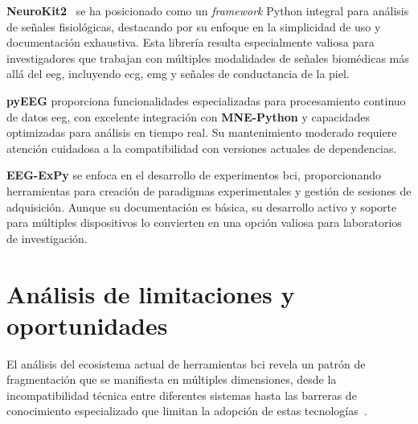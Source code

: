 \begin{table}[h!]
\centering
{}
\caption{Comparativa de librerías especializadas complementarias}
\label{tab:librerias_especializadas}
\end{table}

\textbf{NeuroKit2}~\cite{neurokit2} se ha posicionado como un \textit{\gls{framework}} Python integral para análisis de señales fisiológicas, destacando por su enfoque en la simplicidad de uso y documentación exhaustiva. Esta librería resulta especialmente valiosa para investigadores que trabajan con múltiples modalidades de señales biomédicas más allá del \acrshort{eeg}, incluyendo \acrshort{ecg}, \acrshort{emg} y señales de conductancia de la piel.

\textbf{pyEEG} proporciona funcionalidades especializadas para procesamiento continuo de datos \acrshort{eeg}, con excelente integración con \textbf{MNE-Python} y capacidades optimizadas para análisis en tiempo real. Su mantenimiento moderado requiere atención cuidadosa a la compatibilidad con versiones actuales de dependencias.

\textbf{EEG-ExPy} se enfoca en el desarrollo de experimentos \acrshort{bci}, proporcionando herramientas para creación de paradigmas experimentales y gestión de sesiones de adquisición. Aunque su documentación es básica, su desarrollo activo y soporte para múltiples dispositivos lo convierten en una opción valiosa para laboratorios de investigación.

\section{Análisis de limitaciones y oportunidades}
\label{sec:analisis_limitaciones}

El análisis del ecosistema actual de herramientas \acrshort{bci} revela un patrón de fragmentación que se manifiesta en múltiples dimensiones, desde la incompatibilidad técnica entre diferentes sistemas hasta las barreras de conocimiento especializado que limitan la adopción de estas tecnologías~\cite{brunner2013bnci,lotte2013flaws}.

